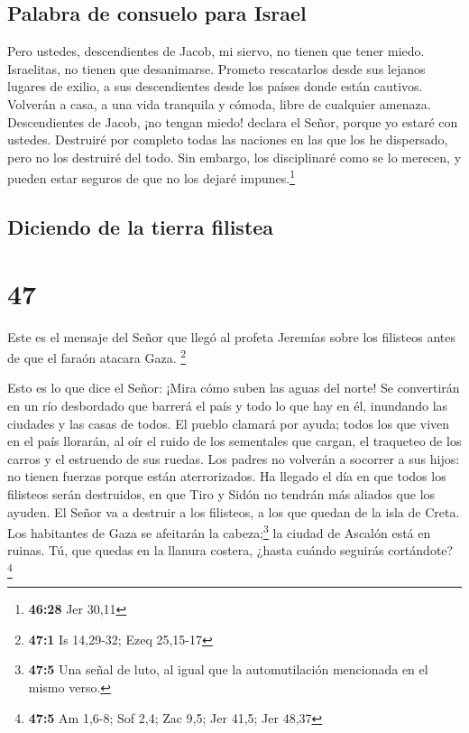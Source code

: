 \hypertarget{palabra-de-consuelo-para-israel}{%
\subsection{Palabra de consuelo para
Israel}\label{palabra-de-consuelo-para-israel}}

 Pero ustedes, descendientes de Jacob, mi siervo, no
tienen que tener miedo. Israelitas, no tienen que desanimarse. Prometo
rescatarlos desde sus lejanos lugares de exilio, a sus descendientes
desde los países donde están cautivos. Volverán a casa, a una vida
tranquila y cómoda, libre de cualquier amenaza. 
Descendientes de Jacob, ¡no tengan miedo! declara el Señor, porque yo
estaré con ustedes. Destruiré por completo todas las naciones en las que
los he dispersado, pero no los destruiré del todo. Sin embargo, los
disciplinaré como se lo merecen, y pueden estar seguros de que no los
dejaré impunes.\footnote{\textbf{46:28} Jer 30,11}

\hypertarget{diciendo-de-la-tierra-filistea}{%
\subsection{Diciendo de la tierra
filistea}\label{diciendo-de-la-tierra-filistea}}

\hypertarget{section-46}{%
\section{47}\label{section-46}}

 Este es el mensaje del Señor que llegó al profeta
Jeremías sobre los filisteos antes de que el faraón atacara Gaza.
\footnote{\textbf{47:1} Is 14,29-32; Ezeq 25,15-17}

 Esto es lo que dice el Señor: ¡Mira cómo suben las aguas
del norte! Se convertirán en un río desbordado que barrerá el país y
todo lo que hay en él, inundando las ciudades y las casas de todos. El
pueblo clamará por ayuda; todos los que viven en el país llorarán,
 al oír el ruido de los sementales que cargan, el
traqueteo de los carros y el estruendo de sus ruedas. Los padres no
volverán a socorrer a sus hijos: no tienen fuerzas porque están
aterrorizados.  Ha llegado el día en que todos los
filisteos serán destruidos, en que Tiro y Sidón no tendrán más aliados
que los ayuden. El Señor va a destruir a los filisteos, a los que quedan
de la isla de Creta.  Los habitantes de Gaza se afeitarán
la cabeza;\footnote{\textbf{47:5} Una señal de luto, al igual que la
  automutilación mencionada en el mismo verso.} la ciudad de Ascalón
está en ruinas. Tú, que quedas en la llanura costera, ¿hasta cuándo
seguirás cortándote? \footnote{\textbf{47:5} Am 1,6-8; Sof 2,4; Zac 9,5;
  Jer 41,5; Jer 48,37}

